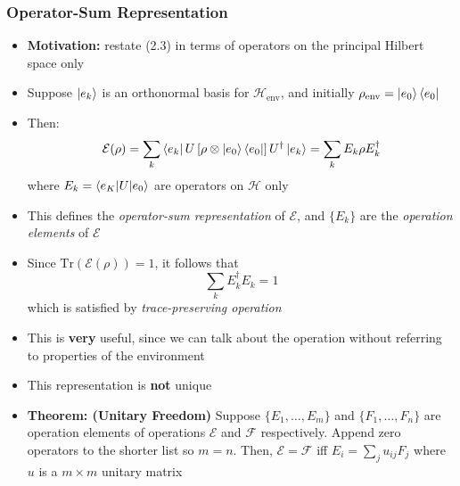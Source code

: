 \documentclass[12pt,a4paper]{article}
\numberwithin{equation}{section}
\newcommand{\ketbra}[2]{\ket{#1}\bra{#2}}
\newcommand{\ketbras}[1]{\ketbra{#1}{#1}}
\begin{document}
	\subsubsection{Operator-Sum Representation}
	\begin{itemize}
		\item \textbf{Motivation:} restate (2.3) in terms of operators on the principal Hilbert space only
		\item Suppose $\ket{e_{k}}$ is an orthonormal basis for $\mathcal{H}_{\text{env}}$, and initially $\rho_{\text{env}}=\ketbras{e_{0}}$
		\item Then:
		\begin{equation} \label{Operator sum} 
			\mathcal{E}(\rho)=\sum_{k}\bra{e_{k}}U\left[\rho\otimes\ketbras{e_{0}}\right]U^{\dagger}\ket{e_{k}}=\sum_{k}E_{k}\rho E_{k}^{\dagger}
		\end{equation} 
		where $E_{k}=\braket{e_{K}|U|e_{0}}$ are operators on $\mathcal{H}$ only
		\item This defines the \textit{operator-sum representation} of $\mathcal{E}$, and $\{E_{k}\}$ are the \textit{operation elements} of $\mathcal{E}$
		\item Since $\text{Tr}(\mathcal{E}(\rho))=1$, it follows that
		$$
			\sum_{k}E_{k}^{\dagger}E_{k}=1
		$$
		which is satisfied by \textit{trace-preserving operation}
		\item This is \textbf{very} useful, since we can talk about the operation without referring to properties of the environment
		\item This representation is \textbf{not} unique
		\item \textbf{Theorem: (Unitary Freedom)} Suppose $\{E_{1},\ldots,E_{m}\}$ and $\{F_{1},\ldots,F_{n}\}$ are operation elements of operations $\mathcal{E}$ and $\mathcal{F}$ respectively. Append zero operators to the shorter list so $m=n$. Then, $\mathcal{E}=\mathcal{F}$ iff $E_{i}=\sum_{j}u_{ij}F_{j}$ where $u$ is a $m\times m$ unitary matrix
	\end{itemize}
\end{document}
